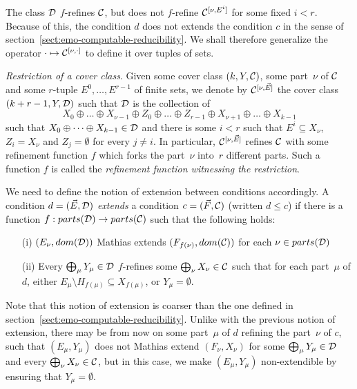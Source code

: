 The class $\mathcal{D}$ $f$-refines $\mathcal{C}$, but does not $f$-refine $\mathcal{C}^{[\nu, E^i]}$ for some fixed $i < r$.
Because of this, the condition $d$ does not extends the condition $c$ in the sense of section~\ref{sect:emo-computable-reducibility}.
We shall therefore generalize the operator $\cdot \mapsto \mathcal{C}^{[\nu, \cdot]}$ to define it over tuples of sets.

\smallskip
\emph{Restriction of a cover class}. Given some cover class $(k, Y, \mathcal{C})$,
some part~$\nu$ of $\mathcal{C}$ and some $r$-tuple $E^0, \dots, E^{r-1}$ of finite sets, we denote by $\mathcal{C}^{[\nu, \vec{E}]}$
the cover class $(k+r-1, Y, \mathcal{D})$ such that $\mathcal{D}$ is the collection of 
\[
X_0 \oplus \dots \oplus X_{\nu-1} \oplus Z_0 \oplus \dots \oplus Z_{r-1} \oplus X_{\nu+1} \oplus \dots \oplus X_{k-1}
\]
such that $X_0 \oplus \dots \oplus X_{k-1} \in \mathcal{D}$ and there is some $i < r$ such that
$E^i \subseteq X_\nu$, $Z_i = X_\nu$ and $Z_j = \emptyset$ for every $j \neq i$.
In particular, $\mathcal{C}^{[\nu, \vec{E}]}$ refines $\mathcal{C}$ with some refinement function $f$ which forks the part~$\nu$
into~$r$ different parts. Such a function $f$ is called the \emph{refinement function witnessing the restriction}.

We need to define the notion of extension between conditions accordingly.
A condition $d = (\vec{E}, \mathcal{D})$ \emph{extends} a condition $c = (\vec{F}, \mathcal{C})$
(written $d \leq c$) if there is a function $f : parts(\mathcal{D}) \to parts(\mathcal{C})$ such that the following holds:
\begin{itemize}
	\item[(i)] $(E_\nu, dom(\mathcal{D}))$ Mathias extends $(F_{f(\nu)}, dom(\mathcal{C}))$ for each $\nu \in parts(\mathcal{D})$ 
	\item[(ii)] Every $\bigoplus_\mu Y_\mu \in \mathcal{D}$ $f$-refines some $\bigoplus_\nu X_\nu \in \mathcal{C}$
	such that for each part~$\mu$ of $d$, either $E_\mu \setminus H_{f(\mu)} \subseteq X_{f(\mu)}$,
	or $Y_\mu = \emptyset$.
\end{itemize}

Note that this notion of extension is coarser than the one defined in section~\ref{sect:emo-computable-reducibility}.
Unlike with the previous notion of extension, there may be from now on some part~$\mu$ of $d$ refining the part~$\nu$ of $c$,
such that $(E_\mu, Y_\mu)$ does not Mathias extend $(F_\nu, X_\nu)$ for some $\bigoplus_\mu Y_\mu \in \mathcal{D}$
and every $\bigoplus_\nu X_\nu \in \mathcal{C}$, but in this case, we make $(E_\mu, Y_\mu)$ non-extendible by ensuring that $Y_\mu = \emptyset$.

